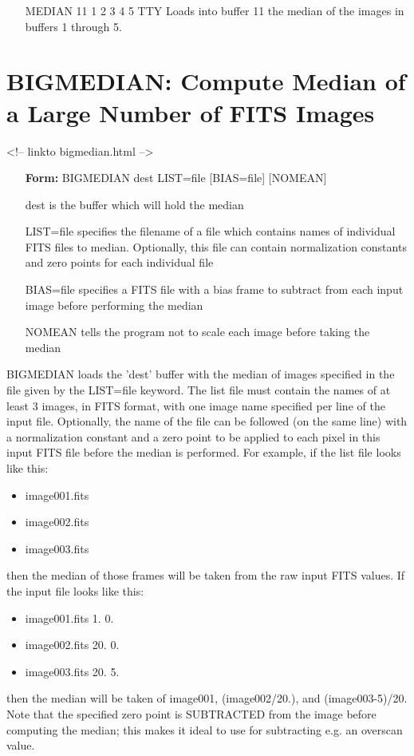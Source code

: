 \begin{itemize}
  \item[MEDIAN 11 1 2 3 4 5 TTY\hfill]{Loads into buffer 11 the median 
       of the images in buffers 1 through 5.}
\end{itemize}

\section{BIGMEDIAN: Compute Median of a Large Number of FITS Images}
\begin{rawhtml}
<!-- linkto bigmedian.html -->
\end{rawhtml}

\begin{itemize}
  \item[\textbf{Form: }BIGMEDIAN dest LIST=file {[BIAS=file]} 
       {[NOMEAN]}\hfill]{}
  \item[dest]{is the buffer which will hold the median}
  \item[LIST=file]{specifies the filename of a file which contains
       names of individual FITS files to median. Optionally,
       this file can contain normalization constants and
       zero points for each individual file}
  \item[BIAS=file]{specifies a FITS file with a bias frame to subtract
       from each input image before performing the median}
  \item[NOMEAN]{tells the program not to scale each image 
       before taking the median}
\end{itemize}

BIGMEDIAN loads the 'dest' buffer with the median of images specified in
the file given by the LIST=file keyword. The list file must contain the
names of at least 3 images, in FITS format, with one image name specified
per line of the input file. Optionally, the name of the file can be
followed (on the same line) with a normalization constant and a zero point
to be applied to each pixel in this input FITS file before the median is
performed. For example, if the list file looks like this:
\begin{itemize}
  \item{image001.fits}
  \item{image002.fits}
  \item{image003.fits}
\end{itemize}
then the median of those frames will be taken from the raw input FITS
values.  If the input file looks like this:
\begin{itemize}
  \item{image001.fits    1.   0.}
  \item{image002.fits   20.   0.}
  \item{image003.fits   20.   5.}
\end{itemize}
then the median will be taken of image001, (image002/20.), and
(image003-5)/20.  Note that the specified zero point is SUBTRACTED from the
image before computing the median; this makes it ideal to use for subtracting e.g. an
overscan value.

